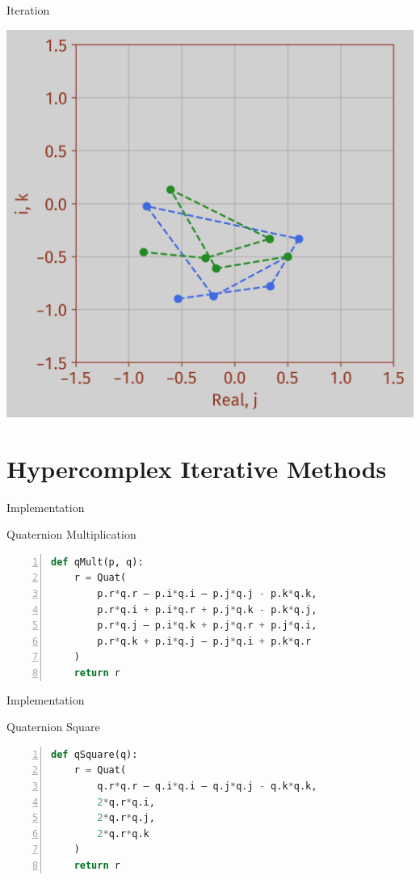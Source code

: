 \documentclass[aspectratio=169,t]{beamer}
\begin{document}
\begin{frame}[label={sec:org579cebb}]{Iteration}
\begin{center}
\includegraphics[height=0.70\textheight]{Figs/exports/Iter_5.png}
\end{center}
\end{frame}

\section{Hypercomplex Iterative Methods}
\label{sec:org8116adb}

\begin{frame}[label={sec:org24ad9e4},fragile]{Implementation}
 \begin{block}{Quaternion Multiplication}
\begin{lstlisting}[language=Python,firstnumber=1,numbers=left]
def qMult(p, q):
    r = Quat(
        p.r*q.r – p.i*q.i – p.j*q.j - p.k*q.k,
        p.r*q.i + p.i*q.r + p.j*q.k - p.k*q.j,
        p.r*q.j – p.i*q.k + p.j*q.r + p.j*q.i,
        p.r*q.k + p.i*q.j – p.j*q.i + p.k*q.r
    )
    return r
\end{lstlisting}
\end{block}
\end{frame}

\begin{frame}[label={sec:org5c6721f},fragile]{Implementation}
 \begin{block}{Quaternion Square}
\begin{lstlisting}[language=Python,firstnumber=1,numbers=left]
def qSquare(q):
    r = Quat(
        q.r*q.r – q.i*q.i – q.j*q.j - q.k*q.k,
        2*q.r*q.i,
        2*q.r*q.j,
        2*q.r*q.k
    )
    return r
\end{lstlisting}
\end{block}
\end{frame}
\end{document}
